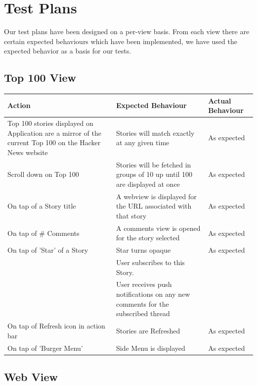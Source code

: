 \documentclass[11pt]{article}
\begin{document}
\section*{Test Plans}

Our test plans have been designed on a per-view basis. From each view there are certain expected behaviours which have been implemented, we have used the expected behavior as a basis for our tests.

\subsection*{Top 100 View}

\begin{center}
    \begin{tabular}{ | p{5cm} | p{5cm} | p{5cm} |}
    \hline
    \textbf{Action} & \textbf{Expected Behaviour} & \textbf{Actual Behaviour} \\
    \hline
    Top 100 stories displayed on Application are a mirror of the current Top 100 on the Hacker News website & Stories will match exactly at any given time & As expected   \\ 	\hline
    Scroll down on Top 100 & Stories will be fetched in groups of 10 up until 100 are displayed at once & As expected \\ 
    \hline
    On tap of a Story title & A webview is displayed for the URL associated with that story & As expected \\
    \hline
	On tap of \# Comments & A comments view is opened for the story selected & As expected \\
	\hline
	On tap of 'Star' of a Story & Star turns opaque & As expected \\ & User subscribes to this Story. & \\ & User receives push notifications on any new comments for the subscribed thread & \\
	\hline
	On tap of Refresh icon in action bar & Stories are Refreshed & As expected \\
	\hline
	On tap of 'Burger Menu' & Side Menu is displayed & As expected \\
	\hline
    \end{tabular}
\end{center}

\subsection*{Web View}
\end{document}
